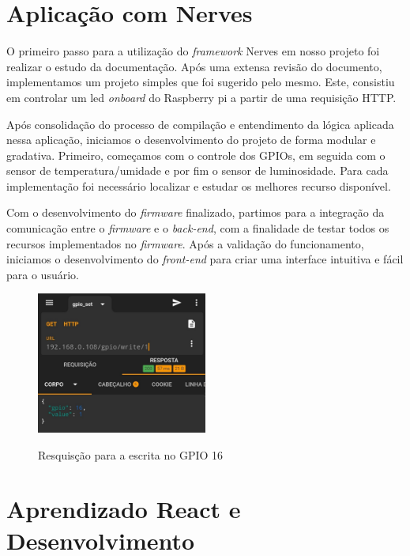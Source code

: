 \documentclass[../../layout.tex]{subfiles}
\begin{document}
\section{Aplicação com Nerves}
O primeiro passo para a utilização do \emph{framework} Nerves em nosso projeto foi realizar o estudo da documentação. Após uma extensa revisão do documento, implementamos um projeto simples que foi sugerido pelo mesmo. Este, consistiu em controlar um led \emph{onboard} do Raspberry pi a partir de uma requisição HTTP.\par
Após consolidação do processo de compilação e entendimento da lógica aplicada nessa aplicação, iniciamos o desenvolvimento do projeto de forma modular e gradativa. Primeiro, começamos com o controle dos GPIOs, em seguida com o sensor de temperatura/umidade e por fim o sensor de luminosidade. Para cada implementação foi necessário localizar e estudar os melhores recurso disponível.\par
Com o desenvolvimento do \emph{firmware} finalizado, partimos para a integração da comunicação entre o \emph{firmware} e o \emph{back-end}, com a finalidade de testar todos os recursos implementados no \emph{firmware}. Após a validação do funcionamento, iniciamos o desenvolvimento do \emph{front-end} para criar uma interface intuitiva e fácil para o usuário.

\begin{figure}[H]
\centering
\caption{Resquisção para a escrita no GPIO 16}
\includegraphics[width=0.5\textwidth]{assets/static/img/request.jpg}
\label{fig:request_gpio}

\begin{minipage}{0.5\textwidth}
\end{minipage}
\end{figure}

\section{Aprendizado React e Desenvolvimento}
\end{document}
